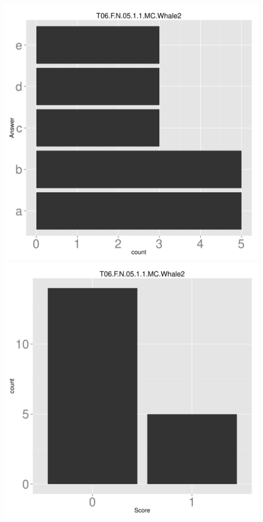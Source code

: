 \documentclass[12pt,nohyper]{tufte-handout}\usepackage[]{graphicx}\usepackage[]{color}
\begin{document}
\begin{center} \includegraphics[width=.45\linewidth]{Topic06_53_answer} \includegraphics[width=.45\linewidth]{Topic06_53_score} \end{center} 
\end{document}
